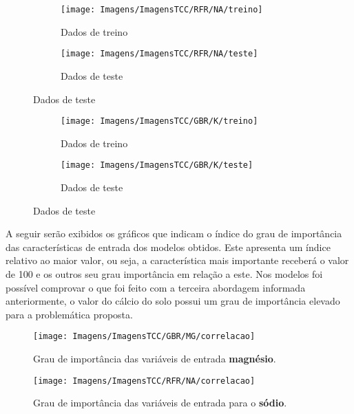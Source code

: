 \documentclass[
12pt,				%
oneside,			%
a4paper,			%
english,			%
french,				%
spanish,			%
brazil				%
]{abntex2}
\begin{document}
\begin{figure}[h]
	\caption{Dados reais e preditos do \textbf{sódio} }
	\label{fig:realpredito}
	\begin{subfigure}{.5\textwidth}
		\centering
		\texttt{[image: Imagens/ImagensTCC/RFR/NA/treino]}
		\caption{Dados de treino}
		\label{fig:rptreinomg}
	\end{subfigure}%
	\begin{subfigure}{.5\textwidth}
		\centering
		\texttt{[image: Imagens/ImagensTCC/RFR/NA/teste]}
		\caption{Dados de teste}
		\label{fig:rptestemg}
	\end{subfigure}
\end{figure}


\begin{figure}[h]
	\caption{Dados reais e preditos do \textbf{potássio} }
	\label{fig:realpredito}
	\begin{subfigure}{.5\textwidth}
		\centering
		\texttt{[image: Imagens/ImagensTCC/GBR/K/treino]}
		\caption{Dados de treino}
		\label{fig:rptreinomg}
	\end{subfigure}%
	\begin{subfigure}{.5\textwidth}
		\centering
		\texttt{[image: Imagens/ImagensTCC/GBR/K/teste]}
		\caption{Dados de teste}
		\label{fig:rptestemg}
	\end{subfigure}
\end{figure}

A seguir serão exibidos os gráficos que indicam o índice do grau de importância das características de entrada dos modelos obtidos. Este apresenta um índice relativo ao maior valor, ou seja, a característica mais importante receberá o valor de 100 e os outros seu grau importância em relação a este.
Nos modelos foi possível comprovar o que foi feito com a terceira abordagem informada anteriormente, o valor do cálcio do solo possui um grau de importância elevado para a problemática proposta. 

\begin{figure}[H]
	\caption{Grau de importância das variáveis de entrada \textbf{magnésio}.}
	\centering %
	\texttt{[image: Imagens/ImagensTCC/GBR/MG/correlacao]} %
	\label{fig:gmgcorrelacao}
\end{figure}

\begin{figure}[H]
	\caption{Grau de importância das variáveis de entrada para o \textbf{sódio}.}
	\centering %
	\texttt{[image: Imagens/ImagensTCC/RFR/NA/correlacao]} %
	\label{fig:rnacorrelacao}
\end{figure}
\end{document}
